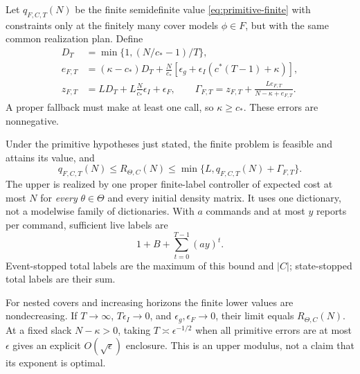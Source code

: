 Let $q_{F,C,T}(N)$ be the finite semidefinite value \eqref{eq:primitive-finite} with constraints only at the finitely many cover models $\phi\in F$, but with the same common realization plan. Define
\begin{align}
 D_T&=\min\{1,(N/c_*-1)/T\},\nonumber\\
 e_{F,T}&=(\kappa-c_*)D_T+
 \frac{N}{c_*}[\epsilon_g+\epsilon_I(c^*(T-1)+\kappa)],\label{eq:compact-budget-error}\\
 z_{F,T}&=LD_T+L\frac{N}{c_*}\epsilon_I+\epsilon_F,
 \qquad
 \Gamma_{F,T}=z_{F,T}+\frac{Le_{F,T}}{N-\kappa+e_{F,T}}.\label{eq:compact-risk-error}
\end{align}
A proper fallback must make at least one call, so $\kappa\ge c_*$. These errors are nonnegative.

\begin{theorem}\label{thm:compact-risk}
Under the primitive hypotheses just stated, the finite problem is feasible and attains its value, and
\begin{equation}\label{eq:compact-risk-sandwich}
 q_{F,C,T}(N)\le R_{\Theta,C}(N)
       \le\min\{L,q_{F,C,T}(N)+\Gamma_{F,T}\}.
\end{equation}
The upper is realized by one proper finite-label controller of expected cost at most $N$ for \emph{every} $\theta\in\Theta$ and every initial density matrix. It uses one dictionary, not a modelwise family of dictionaries. With $a$ commands and at most $y$ reports per command, sufficient live labels are
\begin{equation}\label{eq:compact-labels}
 1+B+\sum_{t=0}^{T-1}(ay)^t.
\end{equation}
Event-stopped total labels are the maximum of this bound and $|C|$; state-stopped total labels are their sum.

For nested covers and increasing horizons the finite lower values are nondecreasing. If $T\to\infty$, $T\epsilon_I\to0$, and $\epsilon_g,\epsilon_F\to0$, their limit equals $R_{\Theta,C}(N)$. At a fixed slack $N-\kappa>0$, taking $T\asymp\epsilon^{-1/2}$ when all primitive errors are at most $\epsilon$ gives an explicit $O(\sqrt\epsilon)$ enclosure. This is an upper modulus, not a claim that its exponent is optimal.
\end{theorem}
